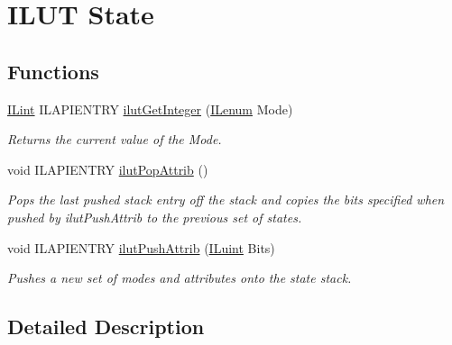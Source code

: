 \hypertarget{group__ilut__state}{\section{I\+L\+U\+T State}
\label{group__ilut__state}
}
\subsection*{Functions}
\begin{DoxyCompactItemize}
\item 
\hyperlink{group__il__types_ga8effe51a00daaa0878631e5af75a36cb}{I\+Lint} I\+L\+A\+P\+I\+E\+N\+T\+R\+Y \hyperlink{group__ilut__state_ga239431131fb8f750ce210c7546d0d035}{ilut\+Get\+Integer} (\hyperlink{group__il__types_ga62ca73445716183ef42b1f3906a45ed0}{I\+Lenum} Mode)
\begin{DoxyCompactList}\small\item\em Returns the current value of the {\itshape Mode}. \end{DoxyCompactList}\item 
\hypertarget{group__ilut__state_gae638fbd9224912d86a1d2499166295bb}{void I\+L\+A\+P\+I\+E\+N\+T\+R\+Y \hyperlink{group__ilut__state_gae638fbd9224912d86a1d2499166295bb}{ilut\+Pop\+Attrib} ()}\label{group__ilut__state_gae638fbd9224912d86a1d2499166295bb}

\begin{DoxyCompactList}\small\item\em Pops the last pushed stack entry off the stack and copies the bits specified when pushed by ilut\+Push\+Attrib to the previous set of states. \end{DoxyCompactList}\item 
void I\+L\+A\+P\+I\+E\+N\+T\+R\+Y \hyperlink{group__ilut__state_gac630c7a042dd4ce6840c7e65bd48901d}{ilut\+Push\+Attrib} (\hyperlink{group__il__types_gaff8e86a1072c8d7cfe387fb87c6ed8e1}{I\+Luint} Bits)
\begin{DoxyCompactList}\small\item\em Pushes a new set of modes and attributes onto the state stack. \end{DoxyCompactList}\end{DoxyCompactItemize}


\subsection{Detailed Description}


